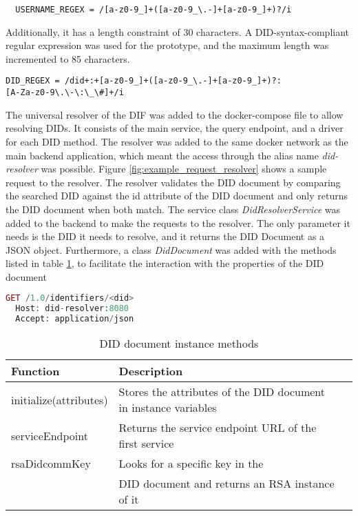 \begin{verbatim}
  USERNAME_REGEX = /[a-z0-9_]+([a-z0-9_\.-]+[a-z0-9_]+)?/i
\end{verbatim}

Additionally, it has a length constraint of 30 characters. A DID-syntax-compliant regular expression was used for the prototype, and the maximum length was incremented to 85 characters. 

\verb|DID_REGEX = /did+:+[a-z0-9_]+([a-z0-9_\.-]+[a-z0-9_]+)?:|\\\verb|[A-Za-z0-9\.\-\:\_\#]+/i |

The universal resolver of the DIF was added to the docker-compose file to allow resolving DIDs. It consists of the main service, the query endpoint, and a driver for each DID method. The resolver was added to the same docker network as the main backend application, which meant the access through the alias name \emph{did-resolver} was possible. Figure \ref{fig:example_request_resolver} shows a sample request to the resolver. The resolver validates the DID document by comparing the searched DID against the id attribute of the DID document and only returns the DID document when both match. The service class \emph{DidResolverService} was added to the backend to make the requests to the resolver. The only parameter it needs is the DID it needs to resolve, and it returns the DID Document as a JSON object. Furthermore, a class \emph{DidDocument} was added with the methods listed in table \ref{table:did_doc_instance_methods}, to facilitate the interaction with the properties of the DID document

\begin{lstlisting}[language=PHP, caption=Example request to the DID resolver, label=fig:example_request_resolver]
  GET /1.0/identifiers/<did>
  Host: did-resolver:8080
  Accept: application/json
\end{lstlisting}

\begin{table}[!ht]
	\centering
	\begin{tabular}{| l | l | l |}
		\hline
    Function & Description \\
		\hline
		\hline
      initialize(attributes) &  Stores the attributes of the DID document in instance variables\\
    \hline
      serviceEndpoint & Returns the service endpoint URL of the first service \\
    \hline
      rsaDidcommKey & Looks for a specific key in the \\ & DID document and returns an RSA instance of it \\
    \hline
	\end{tabular}
	\caption{DID document instance methods}
  \label{table:did_doc_instance_methods}
\end{table}

